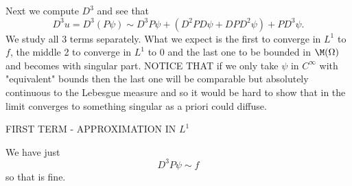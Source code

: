 Next we compute $D^3$ and see that
\begin{equation}
D^3 u = D^3 (P\psi) \sim D^3P \psi + (D^2P D\psi + DP D^2\psi) + P D^3\psi.
\end{equation}
We study all 3 terms separately. What we expect is the first to converge in $L^1$ to $f$, the middle 2 to converge in $L^1$ to $0$ and the last one to be bounded in $\M(\Omega)$ and becomes with singular part. NOTICE THAT if we only take $\psi$ in $C^\infty$ with "equivalent" bounds then the last one will be comparable but absolutely continuous to the Lebesgue measure and so it would be hard to show that in the limit converges to something singular as a priori could diffuse.

{\color{purple} FIRST TERM - APPROXIMATION IN $L^1$}

We have just
\begin{equation}
D^3P \psi \sim f
\end{equation}
so that is fine.

